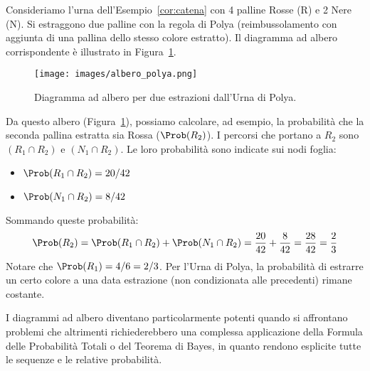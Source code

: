 \begin{example}
Consideriamo l'urna dell'Esempio~\ref{cor:catena} con 4 palline Rosse (R) e 2 Nere (N). Si estraggono due palline con la regola di Polya (reimbussolamento con aggiunta di una pallina dello stesso colore estratto). Il diagramma ad albero corrispondente è illustrato in Figura~\ref{fig:albero_polya}.

\begin{figure}[H]
    \centering
    \texttt{[image: images/albero\_polya.png]} %
    \caption{Diagramma ad albero per due estrazioni dall'Urna di Polya.}
    \label{fig:albero_polya}
\end{figure}
Da questo albero (Figura~\ref{fig:albero_polya}), possiamo calcolare, ad esempio, la probabilità che la seconda pallina estratta sia Rossa ($\Prob(R_2)$). I percorsi che portano a $R_2$ sono $(R_1 \cap R_2)$ e $(N_1 \cap R_2)$. Le loro probabilità sono indicate sui nodi foglia:
\begin{itemize}
    \item $\Prob(R_1 \cap R_2) = 20/42$
    \item $\Prob(N_1 \cap R_2) = 8/42$
\end{itemize}
Sommando queste probabilità:
\[ \Prob(R_2) = \Prob(R_1 \cap R_2) + \Prob(N_1 \cap R_2) = \frac{20}{42} + \frac{8}{42} = \frac{28}{42} = \frac{2}{3} \]
Notare che $\Prob(R_1) = 4/6 = 2/3$. Per l'Urna di Polya, la probabilità di estrarre un certo colore a una data estrazione (non condizionata alle precedenti) rimane costante.
\end{example}

I diagrammi ad albero diventano particolarmente potenti quando si affrontano problemi che altrimenti richiederebbero una complessa applicazione della Formula delle Probabilità Totali o del Teorema di Bayes, in quanto rendono esplicite tutte le sequenze e le relative probabilità.

